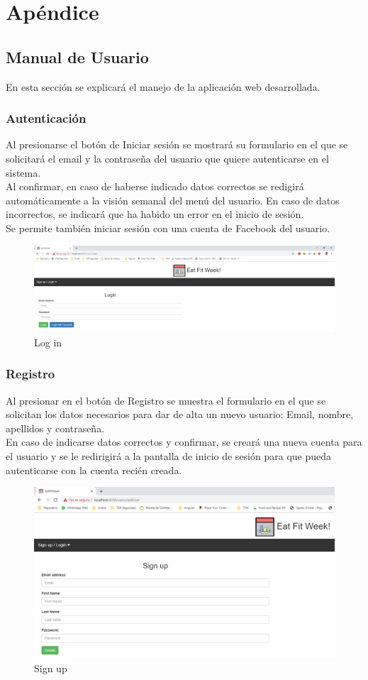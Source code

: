 \documentclass[12pt, a4paper, twoside]{book}
\begin{document}
	\chapter{Apéndice}
	\section{Manual de Usuario}
	En esta sección se explicará el manejo de la aplicación web desarrollada.
	\subsection{Autenticación}
	Al presionarse el botón de Iniciar sesión se mostrará su formulario en el que se solicitará el email y la contraseña del usuario que quiere autenticarse en el sistema. \\
	Al confirmar, en caso de haberse indicado datos correctos se redigirá automáticamente a la visión semanal del menú del usuario. En caso de datos incorrectos, se indicará que ha habido un error en el inicio de sesión.\\
	Se permite también iniciar sesión con una cuenta de Facebook del usuario.
	\begin{figure}[H]
		\centering
		\includegraphics[width=15cm]{Imagenes/MU-Login.png}
		\caption{Log in}\label{Log in}
	\end{figure}
	\subsection{Registro}
	Al presionar en el botón de Registro se muestra el formulario en el que se solicitan los datos necesarios para dar de alta un nuevo usuario: Email, nombre, apellidos y contraseña.\\
	En caso de indicarse datos correctos y confirmar, se creará una nueva cuenta para el usuario y se le redirigirá a la pantalla de inicio de sesión para que pueda autenticarse con la cuenta recién creada.
	\begin{figure}[H]
		\centering
		\includegraphics[width=15cm]{Imagenes/MU-Registro.png}
		\caption{Sign up}\label{Sign up}
	\end{figure}
\end{document}
